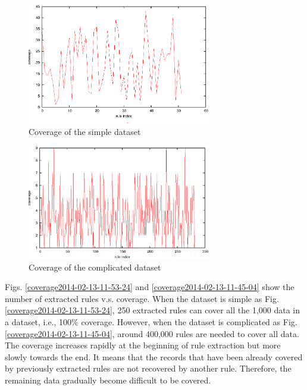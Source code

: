 \documentclass[fleqn,10pt,twocolumn]{SICE14}
\begin{document}
\begin{figure}[tb]
\includegraphics[width=8cm]{coverage-simple}
\caption{\label{affectedcoverage2014-02-13-11-53-24} Coverage of the simple dataset}
\end{figure}
\begin{figure}[tb]
\includegraphics[width=8cm]{coverage-complex}
\caption{\label{affectedcoverage2014-02-13-11-45-04} Coverage of the complicated dataset}
\end{figure}

Figs. \ref{coverage2014-02-13-11-53-24} and \ref{coverage2014-02-13-11-45-04} show the number of extracted rules v.s. coverage. When the dataset is simple as Fig. \ref{coverage2014-02-13-11-53-24}, 250 extracted rules can cover all the 1,000 data in a dataset, i.e., 100\% coverage. However, when the dataset is complicated as Fig. \ref{coverage2014-02-13-11-45-04}, around 400,000 rules are needed to cover all data. 
The coverage increases rapidly at the beginning of rule extraction but more slowly towards the end. It means that the records that have been already covered by previously extracted rules are not recovered by another rule. Therefore, the remaining data gradually become difficult to be covered.  
\end{document}
